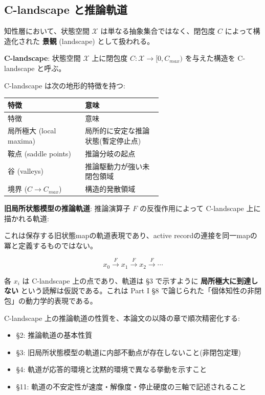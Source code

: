 \bigskip


\subsection{C-landscape と推論軌道}


知性層において、状態空間 $\mathcal{X}$ は単なる抽象集合ではなく、閉包度 $C$ によって構造化された \textbf{景観} (landscape) として扱われる。

\textbf{C-landscape}: 状態空間 $\mathcal{X}$ 上に閉包度 $C: \mathcal{X} \to [0, C_{max})$ を与えた構造を C-landscape と呼ぶ。

C-landscape は次の地形的特徴を持つ:

\begin{longtable}{@{}p{0.30\linewidth}p{0.30\linewidth}@{}}
\toprule
特徴 & 意味 \\
\midrule
\endfirsthead
\toprule
特徴 & 意味 \\
\midrule
\endhead
局所極大 (local maxima) & 局所的に安定な推論状態(暫定停止点) \\
鞍点 (saddle points) & 推論分岐の起点 \\
谷 (valleys) & 推論駆動力が強い未閉包領域 \\
境界 ($C \to C_{max}$) & 構造的発散領域 \\
\bottomrule
\end{longtable}


\textbf{旧局所状態模型の推論軌道}: 推論演算子 $F$ の反復作用によって C-landscape 上に描かれる軌道:

これは保存する旧状態mapの軌道表現であり、active recordの連接を同一mapの冪と定義するものではない。

\[
x_0 \xrightarrow{F} x_1 \xrightarrow{F} x_2 \xrightarrow{F} \cdots
\]

各 $x_i$ は C-landscape 上の点であり、軌道は \S{}3 で示すように \textbf{局所極大に到達しない} という読解は仮説である。これは Part I \S{}8 で論じられた「個体知性の非閉包」の動力学的表現である。

C-landscape 上の推論軌道の性質を、本論文の以降の章で順次精密化する:

\begin{itemize}
\item \S{}2: 推論軌道の基本性質
\item \S{}3: 旧局所状態模型の軌道に内部不動点が存在しないこと(非閉包定理)
\item \S{}4: 軌道が応答的環境と沈黙的環境で異なる挙動を示すこと
\item \S{}11: 軌道の不安定性が速度・解像度・停止硬度の三軸で記述されること
\end{itemize}


